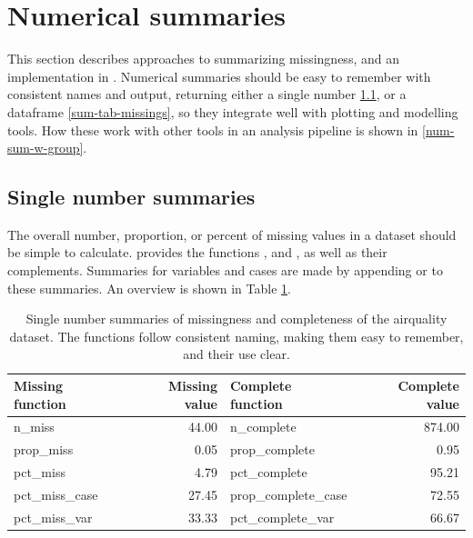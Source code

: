 \documentclass[
]{jss}
\begin{document}
\hypertarget{num-sum}{%
\section{Numerical summaries}\label{num-sum}}

This section describes approaches to summarizing missingness, and an implementation in . Numerical summaries should be easy to remember with consistent names and output, returning either a single number \ref{single-num-sum}, or a dataframe \ref{sum-tab-missings}, so they integrate well with plotting and modelling tools. How these work with other tools in an analysis pipeline is shown in \ref{num-sum-w-group}.

\hypertarget{single-num-sum}{%
\subsection{Single number summaries}\label{single-num-sum}}

The overall number, proportion, or percent of missing values in a dataset should be simple to calculate.  provides the functions ,  and , as well as their complements. Summaries for variables and cases are made by appending  or  to these summaries. An overview is shown in Table \ref{tab:n-prop-pct-miss-complete}.

\begin{CodeChunk}
\begin{table}

\caption{\label{tab:n-prop-pct-miss-complete}Single number summaries of missingness and completeness of the airquality dataset. The functions follow consistent naming, making them easy to remember, and their use clear.}
\centering
\begin{tabular}[t]{l|r|l|r}
\hline
Missing function & Missing value & Complete function & Complete value\\
\hline
n\_miss & 44.00 & n\_complete & 874.00\\
\hline
prop\_miss & 0.05 & prop\_complete & 0.95\\
\hline
pct\_miss & 4.79 & pct\_complete & 95.21\\
\hline
pct\_miss\_case & 27.45 & prop\_complete\_case & 72.55\\
\hline
pct\_miss\_var & 33.33 & pct\_complete\_var & 66.67\\
\hline
\end{tabular}
\end{table}

\end{CodeChunk}
\end{document}
